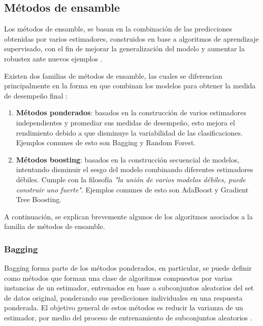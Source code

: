 \subsection{Métodos de ensamble}

Los métodos de ensamble, se basan en la combinación de las predicciones obtenidas por varios estimadores, construidos en base a algoritmos de aprendizaje supervisado, con el fin de mejorar la generalización del modelo y aumentar la robustez ante nuevos ejemplos \cite{dietterich2000ensemble}.

Existen dos familias de métodos de ensamble, las cuales se diferencian principalmente en la forma en que combinan los modelos para obtener la medida de desempeño final \cite{kotsiantis2007supervised}:

\begin{enumerate}
	
	\item \textbf{Métodos ponderados}: basados en la construcción de varios estimadores independientes y promediar sus medidas de desempeño, esto mejora el rendimiento debido a que disminuye la variabilidad de las clasificaciones. Ejemplos comunes de esto son Bagging y Random Forest.
	
	\item \textbf{Métodos boosting}: basados en la construcción secuencial de modelos, intentando disminuir el sesgo del modelo combinando diferentes estimadores débiles. Cumple con la filosofía \textit{"la unión de varios modelos débiles, puede construir uno fuerte"}. Ejemplos comunes de esto son AdaBoost y Gradient Tree Boosting.
	
\end{enumerate}

A continuación, se explican brevemente algunos de los algoritmos asociados a la familia de métodos de ensamble.

\subsubsection{Bagging}

Bagging forma parte de los métodos ponderados, en particular, se puede definir como métodos que forman una clase de algoritmos compuestos por varias instancias de un estimador, entrenados en base a subconjuntos aleatorios del set de datos original, ponderando sus predicciones individuales en una respuesta ponderada. El objetivo general de estos métodos es reducir la varianza de un estimador, por medio del proceso de entrenamiento de subconjuntos aleatorios \cite{breiman1996bagging}. 

